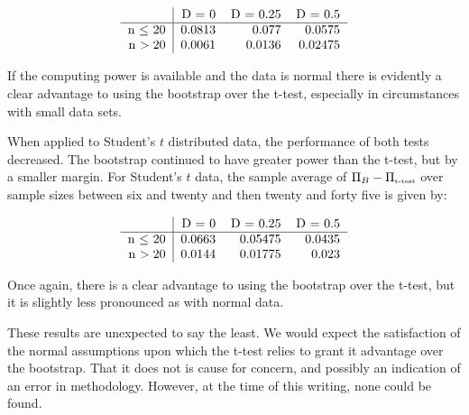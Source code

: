 \begin{eqnarray}
\label{table: normaldataPowerdifference}
\begin{tabular}{r | r  r r}
             & D = 0 & D = 0.25 & D = 0.5 \\ \hline
n $\leq$ 20  & 0.0813 & 0.077 & 0.0575  \\
n $> 20$ & 0.0061 & 0.0136 & 0.02475   \\
\end{tabular}
\end{eqnarray}


If the computing power is available and the data is normal there is evidently a clear advantage to using the bootstrap over the t-test, especially in circumstances with small data sets.


When applied to Student's $t$ distributed data, the performance of both tests decreased. The bootstrap continued to have greater power than the t-test, but by a smaller margin. For Student's $t$ data, the sample average of $\Pi_B - \Pi_{\mbox{\tiny{t-test}}}$ over sample sizes between six and twenty and then twenty and forty five is given by:

\begin{eqnarray}
\label{table: studentstdataPowerdifference}
\begin{tabular}{r | r  r r}
             & D = 0 & D = 0.25 & D = 0.5 \\ \hline
n $\leq$ 20  & 0.0663 & 0.05475 & 0.0435  \\
n $> 20$ & 0.0144 &0.01775 & 0.023   \\
\end{tabular}
\end{eqnarray}

Once again, there is a clear advantage to using the bootstrap over the t-test, but it is  slightly less pronounced as with normal data.

These results are unexpected to say the least. We would expect the satisfaction of the normal assumptions upon which the t-test relies to grant it advantage over the bootstrap. That it does not is cause for concern, and possibly an indication of an error in methodology. However, at the time of this writing, none could be found.







